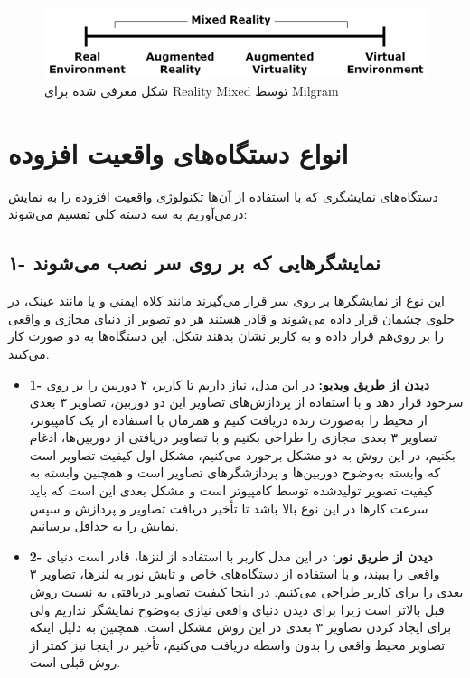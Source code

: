 \begin{figure}[!ht]
	\centering
	\includegraphics[width=1\linewidth]{image/mixedreality}
	\caption {شکل معرفی شده برای Reality Mixed توسط Milgram\cite{Milgram}}
	\label{fig:Mixed}
\end{figure}

\section{انواع دستگاه‌های واقعیت افزوده}
دستگاه‌های نمایشگری که با استفاده از آن‌ها تکنولوژی واقعیت افزوده را به نمایش درمی‌آوریم به سه دسته کلی تقسیم می‌شوند\cite{Julie}:
\\
\subsection{
	۱- نمایشگرهایی که بر روی سر نصب می‌شوند\protect{} }این نوع از نمایشگرها بر روی سر قرار می‌گیرند مانند کلاه ایمنی و یا مانند عینک، در جلوی چشمان قرار داده می‌شوند و  قادر هستند هر دو تصویر از دنیای مجازی و واقعی را بر روی‌هم قرار داده و به کاربر نشان بدهند شکل. این دستگاه‌ها به دو صورت کار می‌کنند.
\begin{itemize}
	\item \textbf{1- دیدن از طریق ویدیو:} در این مدل، نیاز داریم تا کاربر، ۲ دوربین را بر روی سرخود قرار دهد و با استفاده از پردازش‌های تصاویر این دو دوربین، تصاویر ۳ بعدی از محیط را  به‌صورت زنده دریافت کنیم و همزمان با استفاده از یک کامپیوتر، تصاویر ۳ بعدی مجازی را طراحی بکنیم و با تصاویر دریافتی از دوربین‌ها، ادغام بکنیم، در این روش به دو مشکل برخورد می‌کنیم، مشکل اول کیفیت تصاویر است که وابسته به‌وضوح  دوربین‌ها و پردازشگرهای تصاویر است و همچنین وابسته به کیفیت تصویر تولیدشده توسط کامپیوتر است و مشکل بعدی این است که باید سرعت کارها در این نوع بالا باشد تا تأخیر دریافت تصاویر و پردازش و سپس نمایش را به حداقل برسانیم.
	\item \textbf{
		2- دیدن از طریق نور: }در این مدل کاربر با استفاده از لنزها، قادر است دنیای واقعی را ببیند، و با استفاده از دستگاه‌های خاص و تابش نور به لنزها، تصاویر ۳ بعدی را برای کاربر طراحی می‌کنیم. در اینجا کیفیت تصاویر دریافتی به نسبت روش قبل بالاتر است زیرا برای دیدن دنیای واقعی نیازی به‌وضوح نمایشگر نداریم ولی برای ایجاد کردن تصاویر ۳ بعدی در این روش مشکل است. همچنین به دلیل اینکه تصاویر محیط واقعی را بدون واسطه دریافت می‌کنیم، تأخیر در اینجا نیز کمتر از روش قبلی است.
\end{itemize}

